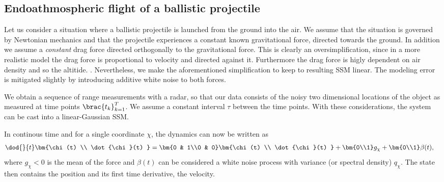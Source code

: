 

\subsection{Endoathmospheric flight of a ballistic projectile}\label{sec:ballistic}
Let us consider a situation where a ballistic projectile is launched
from the ground into the air. We assume that the situation is governed by Newtonian
mechanics and that the projectile experiences a constant known gravitational
force, directed towards the ground. In addition we assume a \emph{constant}
drag force directed orthogonally to the gravitational force. This is clearly
an oversimplification, since in a more realistic model the drag
force is proportional to velocity and directed against it. Furthermore
the drag force is higly dependent on air density and so the altitide. \parencite{ristic2004beyond}.
Nevertheless, we make the aforementioned simplification to keep to resulting
SSM linear. The modeling error is mitigated slightly by introducing
additive white noise to both forces.

We obtain a sequence of range measurements with a radar,
so that our data consists of the noisy two dimensional locations 
of the object as measured at time points $\brac{t_k}_{k=1}^T$.
We assume a constant interval $\tau$ between the time points. With these 
considerations, the system can be cast into a linear-Gaussian SSM. 

In continous time and for a single coordinate $\chi$, 
the dynamics can now be written as
\begin{align}
	\dod{}{t}\bm{\chi(t) \\ \dot{\chi}(t) } &= 
	\bm{0 & 1\\0 & 0}\bm{\chi(t) \\ \dot{\chi}(t) } + \bm{0\\1}g_\chi + \bm{0\\1}\beta(t),
	\label{eq:ct_linear}
\end{align}
where $g_\chi<0$ is the mean of the force and $\beta(t)$ can be considered
a white noise process with variance (or spectral density) $q_\chi$. 
The state then contains the position and its first time derivative, the velocity. 



